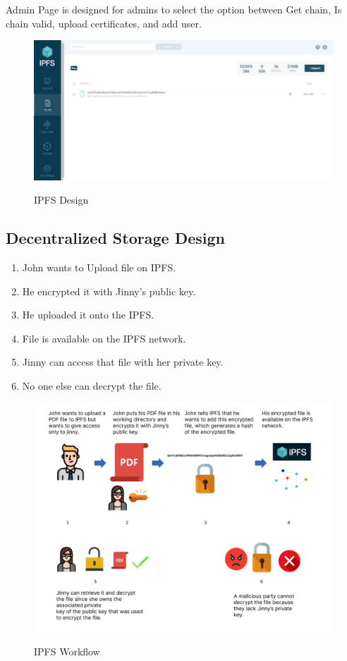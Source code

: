 Admin Page is designed for admins to select the option between Get chain, Is chain valid, upload certificates, and add user.

\begin{figure}[H]
    \centering
    \includegraphics[scale=0.37]{images/ipfs-UI.jpeg}\\[0.5cm]
    \caption{IPFS Design}
    \label{fig:my_label}
\end{figure}

\subsection{Decentralized Storage Design}
\begin{enumerate}
    \item John wants to Upload file on IPFS.
    \item He encrypted it with Jinny's public key.
    \item He uploaded it onto the IPFS.
    \item File is available on the IPFS network.
    \item Jinny can access that file with her private key.
    \item No one else can decrypt the file.
\end{enumerate}

\begin{figure}[H]
    \centering
    \includegraphics[scale=0.26]{images/ipfs_workflow.png}\\[0.5cm]
    \caption{IPFS Workflow}
    \label{fig:my_label}
\end{figure}

